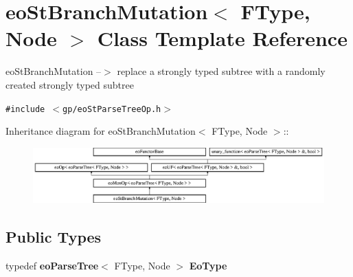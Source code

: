 \section{eo\-St\-Branch\-Mutation$<$ FType, Node $>$ Class Template Reference}
\label{classeo_st_branch_mutation}
eo\-St\-Branch\-Mutation --$>$ replace a strongly typed subtree with a randomly created strongly typed subtree  


{\tt \#include $<$gp/eo\-St\-Parse\-Tree\-Op.h$>$}

Inheritance diagram for eo\-St\-Branch\-Mutation$<$ FType, Node $>$::\begin{figure}[H]
\begin{center}
\leavevmode
\includegraphics[height=2.14559cm]{classeo_st_branch_mutation}
\end{center}
\end{figure}
\subsection*{Public Types}
\begin{CompactItemize}
\item 
typedef {\bf eo\-Parse\-Tree}$<$ FType, Node $>$ {\bf Eo\-Type}\label{classeo_st_branch_mutation_w0}

\end{CompactItemize}
